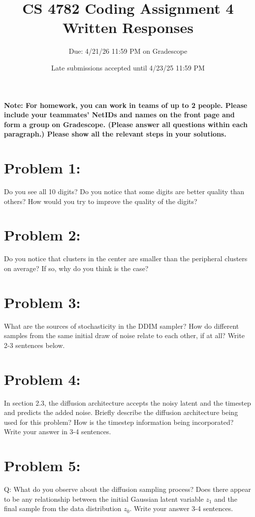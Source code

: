 \documentclass{article}
\title{CS 4782 Coding Assignment 4 Written Responses\vspace{-10pt}}
\author{Due: 4/21/26 11:59 PM on Gradescope}
\date{Late submissions accepted until 4/23/25 11:59 PM}
\begin{document}
    \maketitle
    \textbf{Note: For homework, you can work in teams of up to 2 people. Please include your teammates’ NetIDs and names on the front page and form a group on Gradescope. (Please answer all questions within each paragraph.) Please show all the relevant steps in your solutions. }
\maketitle
\section*{Problem 1:}

Do you see all 10 digits? Do you notice that some digits are better quality than others? How would you try to improve the quality of the digits?

\section*{Problem 2:}

Do you notice that clusters in the center are smaller than the peripheral clusters on average? If so, why do you think is the case?

\section*{Problem 3:}

What are the sources of stochasticity in the DDIM sampler? How do different samples from the same initial draw of noise relate to each other, if at all? Write 2-3 sentences below.

\section*{Problem 4:}

In section 2.3, the diffusion architecture accepts the noisy latent and the timestep and predicts the added noise. Briefly describe the diffusion architecture being used for this problem? How is the timestep information being incorporated? Write your answer in 3-4 sentences.

\section*{Problem 5:}
Q: What do you observe about the diffusion sampling process? Does there appear to be any relationship between the initial Gaussian latent variable $z_1$ and the final sample from the data distribution $z_0$. Write your answer 3-4 sentences.
\end{document}
